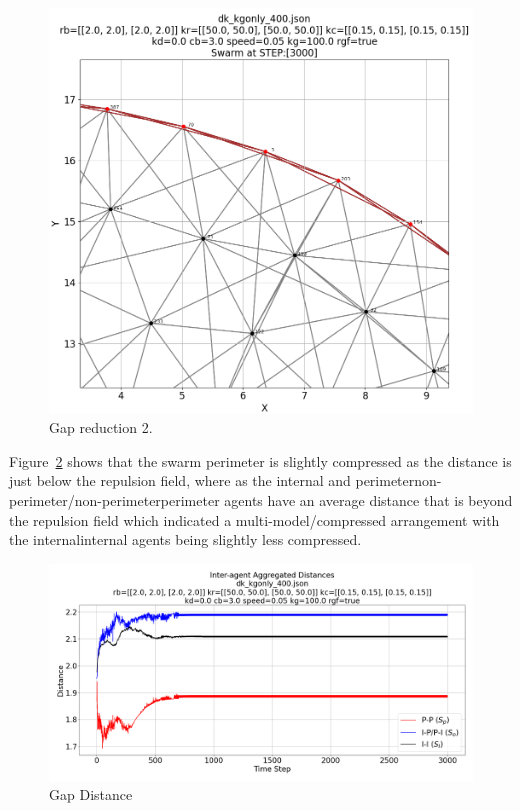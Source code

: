 \documentclass[12pt,a4paper]{IEEEtran}
\begin{document}
\begin{figure}[H]
	\begin{center}
		\includegraphics[width=1.0\linewidth]{figures/gap2}
	\end{center}
	\caption{Gap reduction 2. \label{fig:gap2}}
\end{figure}

Figure~\ref{fig:gapDistance} shows that the swarm perimeter is slightly compressed as the distance is just below the repulsion field, where as the internal and perimeter\textrightarrow non-perimeter/non-perimeter\textrightarrow perimeter agents have an average distance that is beyond the repulsion field which indicated a multi-model/compressed arrangement with the internal\textrightarrow internal agents being slightly less compressed.

\begin{figure}[H]
	\begin{center}
		\includegraphics[width=1.0\linewidth]{figures/gapDistance}
	\end{center}
	\caption{Gap Distance\label{fig:gapDistance}}
\end{figure}
\end{document}
